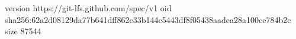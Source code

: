 version https://git-lfs.github.com/spec/v1
oid sha256:62a2d08129da77b641dff862c33b144c5443df8f05438aadea28a100ce784b2c
size 87544
